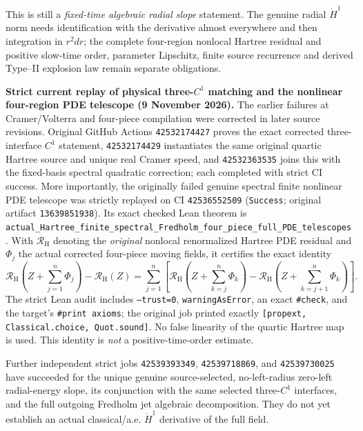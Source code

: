 \documentclass[11pt]{amsart}
\begin{document}
This is still a \emph{fixed-time algebraic radial slope} statement.
The genuine radial $\dot H^1$ norm needs identification with
the derivative almost everywhere and then integration in
$r^2dr$; the complete four-region nonlocal Hartree residual and
positive slow-time order, parameter Lipschitz, finite source recurrence
and derived Type--II explosion law remain separate obligations.


\medskip
\noindent\textbf{Strict current replay of physical three-$C^1$ matching
and the nonlinear four-region PDE telescope (9 November 2026).}
The earlier failures at Cramer/Volterra and four-piece compilation were
corrected in later source revisions. Original GitHub Actions
\texttt{42532174427} proves the exact corrected three-interface
$C^1$ statement, \texttt{42532174429} instantiates the same original
quartic Hartree source and unique real Cramer speed, and
\texttt{42532363535} joins this with the fixed-basis spectral
quadratic correction; each completed with strict CI success.
More importantly, the originally failed genuine spectral finite
nonlinear PDE telescope was strictly replayed on CI
\texttt{42536552509} (\texttt{Success}; original artifact
\texttt{13639851938}). Its exact checked Lean theorem is
\texttt{actual\_Hartree\_finite\_spectral\_Fredholm\_four\_piece\_full\_PDE\_telescopes}.
With $\mathcal R_{\mathrm H}$ denoting the \emph{original} nonlocal
renormalized Hartree PDE residual and $\Phi_j$ the actual corrected
four-piece moving fields, it certifies the exact identity
\[
 \mathcal R_{\mathrm H}\!\left(Z+\sum_{j=1}^{n}\Phi_j\right)
 -\mathcal R_{\mathrm H}(Z)
 =
 \sum_{j=1}^{n}\left[
 \mathcal R_{\mathrm H}\!\left(Z+\sum_{k=j}^{n}\Phi_k\right)
 -
 \mathcal R_{\mathrm H}\!\left(Z+\sum_{k=j+1}^{n}\Phi_k\right)
 \right].
\]
The strict Lean audit includes \texttt{--trust=0},
\texttt{warningAsError}, an exact \texttt{\#check}, and the target's
\texttt{\#print axioms}; the original job printed exactly
\texttt{[propext, Classical.choice, Quot.sound]}.
No false linearity of the quartic Hartree map is used.
This identity is \emph{not} a positive-time-order estimate.

Further independent strict jobs \texttt{42539393349},
\texttt{42539718869}, and \texttt{42539730025} have succeeded
for the unique genuine source-selected, no-left-radius zero-left
radial-energy slope, its conjunction with the same selected
three-$C^1$ interfaces, and the full outgoing Fredholm jet algebraic
decomposition. They do not yet establish an actual classical/a.e.
$\dot H^1$ derivative of the full field.
\end{document}
